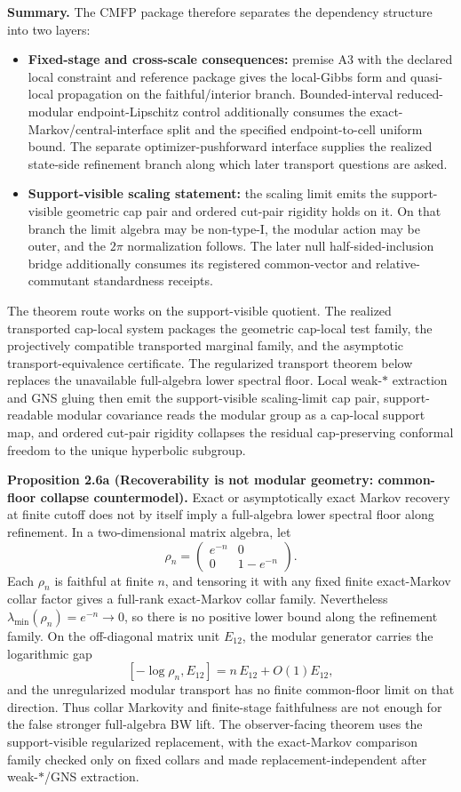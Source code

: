 \textbf{Summary.} The CMFP package therefore separates the dependency structure into two layers:
\begin{itemize}
\item
\textbf{Fixed-stage and cross-scale consequences:} premise A3 with the declared local constraint and reference package gives the local-Gibbs form and quasi-local propagation on the faithful/interior branch. Bounded-interval reduced-modular endpoint-Lipschitz control additionally consumes the exact-Markov/central-interface split and the specified endpoint-to-cell uniform bound. The separate optimizer-pushforward interface supplies the realized state-side refinement branch along which later transport questions are asked.
\item
\textbf{Support-visible scaling statement:} the scaling limit emits the support-visible geometric cap pair and ordered cut-pair rigidity holds on it. On that branch the limit algebra may be non-type-I, the modular action may be outer, and the \(2\pi\) normalization follows.  The later null half-sided-inclusion bridge additionally consumes its registered common-vector and relative-commutant standardness receipts.
\end{itemize}

The theorem route works on the support-visible quotient. The realized transported cap-local system packages the geometric cap-local test family, the projectively compatible transported marginal family, and the asymptotic transport-equivalence certificate. The regularized transport theorem below replaces the unavailable full-algebra lower spectral floor. Local weak-\(*\) extraction and GNS gluing then emit the support-visible scaling-limit cap pair, support-readable modular covariance reads the modular group as a cap-local support map, and ordered cut-pair rigidity collapses the residual cap-preserving conformal freedom to the unique hyperbolic subgroup.

\textbf{Proposition 2.6a (Recoverability is not modular geometry: common-floor collapse countermodel).} Exact or asymptotically exact Markov recovery at finite cutoff does not by itself imply a full-algebra lower spectral floor along refinement. In a two-dimensional matrix algebra, let
\[
\rho_n=\begin{pmatrix}e^{-n}&0\\0&1-e^{-n}\end{pmatrix}.
\]
Each \(\rho_n\) is faithful at finite \(n\), and tensoring it with any fixed finite exact-Markov collar factor gives a full-rank exact-Markov collar family. Nevertheless \(\lambda_{\min}(\rho_n)=e^{-n}\to0\), so there is no positive lower bound along the refinement family. On the off-diagonal matrix unit \(E_{12}\), the modular generator carries the logarithmic gap
\[
[ -\log\rho_n, E_{12} ] = n\,E_{12}+O(1)E_{12},
\]
and the unregularized modular transport has no finite common-floor limit on that direction. Thus collar Markovity and finite-stage faithfulness are not enough for the false stronger full-algebra BW lift. The observer-facing theorem uses the support-visible regularized replacement, with the exact-Markov comparison family checked only on fixed collars and made replacement-independent after weak-\(*\)/GNS extraction.

